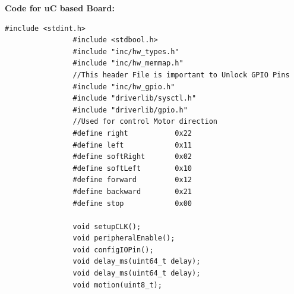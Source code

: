 \documentclass[a4paper,10pt,oneside]{article}
\begin{document}
			\textbf{Code for uC based Board:}
			\begin{lstlisting}[style=CStyle]
				#include <stdint.h>
				#include <stdbool.h>
				#include "inc/hw_types.h"
				#include "inc/hw_memmap.h"
				//This header File is important to Unlock GPIO Pins
				#include "inc/hw_gpio.h"
				#include "driverlib/sysctl.h"
				#include "driverlib/gpio.h"	
				//Used for control Motor direction
				#define right           0x22
				#define left            0x11
				#define softRight       0x02
				#define softLeft        0x10
				#define forward         0x12
				#define backward        0x21
				#define stop            0x00
			
				void setupCLK();
				void peripheralEnable();
				void configIOPin();
				void delay_ms(uint64_t delay);
				void delay_ms(uint64_t delay);
				void motion(uint8_t);
				

\end{lstlisting}
\end{document}
